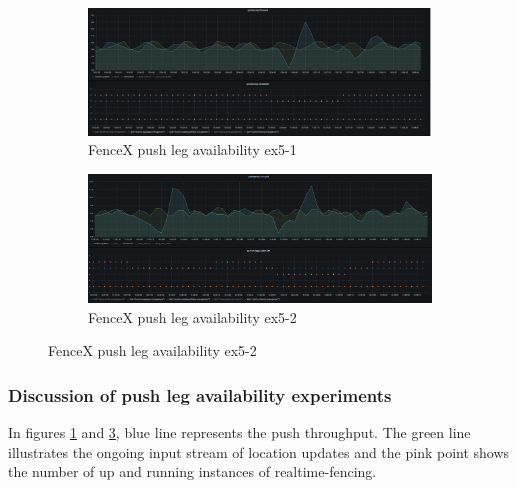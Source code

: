 \documentclass[a4]{report}
\begin{document}
    \begin{figure}
        \centering
        \begin{subfigure}[b]{\textwidth}
            \centering
            \caption{FenceX push leg availability ex5-1}
            \label{fig:ex5-1}
            \includegraphics[width=\textwidth, height=0.35\textheight, scale=2]{images/evaluation/ex5-benchmarking-ongoing-2per6sec.png}
        \end{subfigure}

        \begin{subfigure}[b]{\textwidth}
            \centering
            \caption{FenceX push leg availability ex5-2}
            \label{fig:ex5-2}
            \includegraphics[width=\textwidth, height=0.35\textheight, scale=2]{images/evaluation/ex5-benchmarking-ongoing-2per7sec.png}
        \end{subfigure}
    \end{figure}

    \clearpage

    \subsubsection{Discussion of push leg availability experiments}
    In figures \ref{fig:ex5-1} and \ref{fig:ex5-2}, blue line represents the push throughput.
    The green line illustrates the ongoing input stream of location updates and the pink point shows the number of up and running instances of realtime-fencing.
\end{document}
